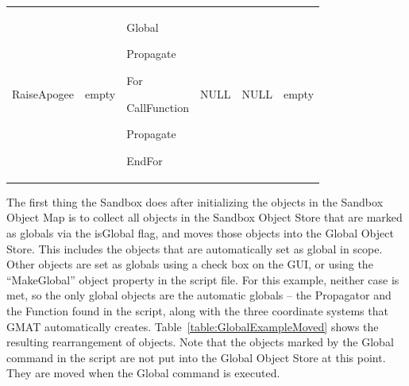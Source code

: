\begin{center}
\begin{supertabular}{|p{0.95in}|p{0.95in}|p{0.95in}|p{0.95in}|p{0.95in}|p{0.95in}|}
\begin{small}
RaiseApogee
\end{small} &
\begin{small}
empty
\end{small} &
\begin{small}
Global

Propagate

For

CallFunction

Propagate

EndFor
\end{small} &
\begin{small}
NULL
\end{small} &
\begin{small}
NULL
\end{small} &
\begin{small}
empty
\end{small} \\
\end{supertabular}
\end{center}

The first thing the Sandbox does after initializing the objects in the Sandbox Object Map is to
collect all objects in the Sandbox Object Store that are marked as globals via the isGlobal flag,
and moves those objects into the Global Object Store.  This includes the objects that are
automatically set as global in scope.  Other objects are set as globals using a check box on the
GUI, or using the ``MakeGlobal'' object property in the script file.  For this example, neither case
is met, so the only global objects are the automatic globals -- the Propagator and the
Function found in the script, along with the three coordinate systems that GMAT automatically
creates. Table~\ref{table:GlobalExampleMoved} shows the resulting rearrangement of objects.  Note
that the objects marked by the Global command in the script are not put into the Global Object
Store at this point.  They are moved when the Global command is executed.

